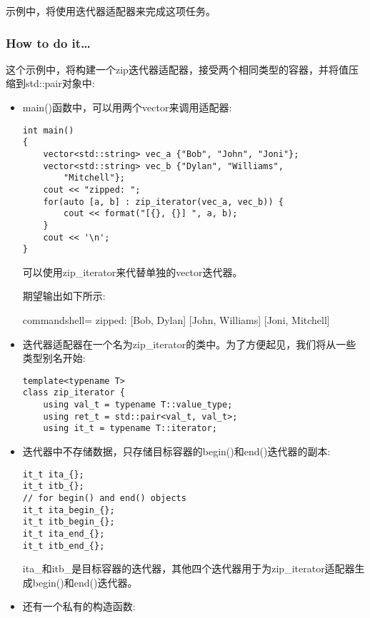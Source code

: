 示例中，将使用迭代器适配器来完成这项任务。

\subsubsection{How to do it…}

这个示例中，将构建一个zip迭代器适配器，接受两个相同类型的容器，并将值压缩到std::pair对象中:

\begin{itemize}
\item 
main()函数中，可以用两个vector来调用适配器:

\begin{lstlisting}[style=styleCXX]
int main()
{
	vector<std::string> vec_a {"Bob", "John", "Joni"};
	vector<std::string> vec_b {"Dylan", "Williams",
		"Mitchell"};
	cout << "zipped: ";
	for(auto [a, b] : zip_iterator(vec_a, vec_b)) {
		cout << format("[{}, {}] ", a, b);
	}
	cout << '\n';
}
\end{lstlisting}

可以使用zip\_iterator来代替单独的vector迭代器。

期望输出如下所示:

\begin{tcblisting}{commandshell={}}
zipped: [Bob, Dylan] [John, Williams] [Joni, Mitchell]
\end{tcblisting}

\item 
迭代器适配器在一个名为zip\_iterator的类中。为了方便起见，我们将从一些类型别名开始:

\begin{lstlisting}[style=styleCXX]
template<typename T>
class zip_iterator {
	using val_t = typename T::value_type;
	using ret_t = std::pair<val_t, val_t>;
	using it_t = typename T::iterator;
\end{lstlisting}

\item 
迭代器中不存储数据，只存储目标容器的begin()和end()迭代器的副本:

\begin{lstlisting}[style=styleCXX]
it_t ita_{};
it_t itb_{};
// for begin() and end() objects
it_t ita_begin_{};
it_t itb_begin_{};
it_t ita_end_{};
it_t itb_end_{};
\end{lstlisting}

ita\_和itb\_是目标容器的迭代器，其他四个迭代器用于为zip\_iterator适配器生成begin()和end()迭代器。

\item 
还有一个私有的构造函数:


\end{itemize}
